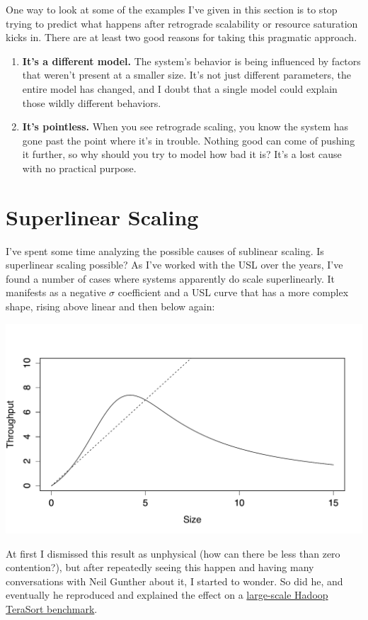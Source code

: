 \documentclass{vivid_layout}
\begin{document}
One way to look at some of the examples I've given in this section is to stop
trying to predict what happens after retrograde scalability or resource
saturation kicks in. There are at least two good reasons for taking this
pragmatic approach.

\begin{enumerate}
\item {\bfseries It's a different model.} The system's behavior is being
influenced by factors that weren't present at a smaller size. It's not just
different parameters, the entire model has changed, and I doubt that a
single model could explain those wildly different behaviors.
\item {\bfseries It's pointless.}  When you see retrograde scaling, you know the
system has gone past the point where it's in trouble. Nothing good can come of
pushing it further, so why should you try to model how bad it is? It's a lost
cause with no practical purpose.
\end{enumerate}

\section{Superlinear Scaling}

I've spent some time analyzing the possible causes of sublinear scaling. Is
superlinear scaling possible? As I've worked with the USL over the years, I've
found a number of cases where systems apparently do scale superlinearly. It
manifests as a negative $\sigma$ coefficient and a USL curve that has a more
complex shape, rising above linear and then below again:
\begin{center}
\includegraphics[width=.85\linewidth]{scalability/superlinear}
\end{center}

At first I dismissed this result as unphysical (how can there be less than zero
contention?), but after repeatedly seeing this happen and having many
conversations with Neil Gunther about it, I started to wonder. So did he, and
eventually he reproduced and explained the effect on a
\href{https://queue.acm.org/detail.cfm?id=2789974}{large-scale Hadoop TeraSort
benchmark}.
\end{document}
